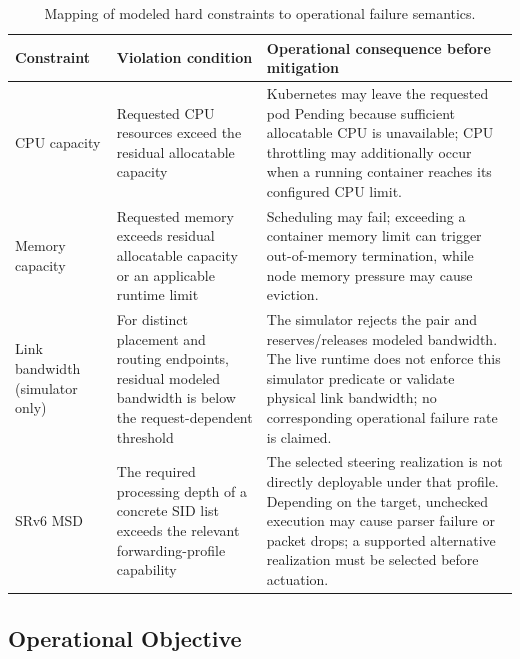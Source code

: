 \documentclass[final,5p]{elsarticle}
\newcommand{\rev}[1]{\textcolor{revisiongreen}{#1}}
\begin{document}
\begin{table}[!tb]
\centering
\caption{\rev{Mapping of modeled hard constraints to operational failure semantics.}}
\label{tab:hard_constraint_failure_mapping}
\renewcommand{\arraystretch}{1.15}
\small
\begin{tabularx}{\textwidth}{p{2.6cm}p{4.0cm}X}
\toprule
\rev{\textbf{Constraint}} & \rev{\textbf{Violation condition}} & \rev{\textbf{Operational consequence before mitigation}} \\
\midrule
\rev{CPU capacity} & \rev{Requested CPU resources exceed the residual allocatable capacity} & \rev{Kubernetes may leave the requested pod Pending because sufficient allocatable CPU is unavailable; CPU throttling may additionally occur when a running container reaches its configured CPU limit.} \\
\rev{Memory capacity} & \rev{Requested memory exceeds residual allocatable capacity or an applicable runtime limit} & \rev{Scheduling may fail; exceeding a container memory limit can trigger out-of-memory termination, while node memory pressure may cause eviction.} \\
\rev{Link bandwidth (simulator only)} & \rev{For distinct placement and routing endpoints, residual modeled bandwidth is below the request-dependent threshold} & \rev{The simulator rejects the pair and reserves/releases modeled bandwidth. The live runtime does not enforce this simulator predicate or validate physical link bandwidth; no corresponding operational failure rate is claimed.} \\
\rev{SRv6 MSD} & \rev{The required processing depth of a concrete SID list exceeds the relevant forwarding-profile capability} & \rev{The selected steering realization is not directly deployable under that profile. Depending on the target, unchecked execution may cause parser failure or packet drops; a supported alternative realization must be selected before actuation.} \\
\bottomrule
\end{tabularx}
\end{table}

\subsection{Operational Objective}
\label{subsec:objective_metrics}
\end{document}

